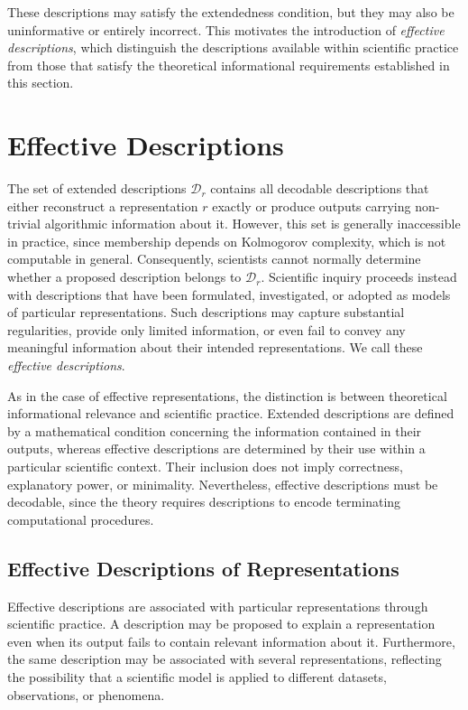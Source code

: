 These descriptions may satisfy the extendedness condition, but they may also be uninformative or entirely incorrect. This motivates the introduction of \emph{effective descriptions}, which distinguish the descriptions available within scientific practice from those that satisfy the theoretical informational requirements established in this section.

%
%

\section{Effective Descriptions}
\label{sec:effective_descriptions}

The set of extended descriptions $\mathcal{D}_r$ contains all decodable descriptions that either reconstruct a representation $r$ exactly or produce outputs carrying non-trivial algorithmic information about it. However, this set is generally inaccessible in practice, since membership depends on Kolmogorov complexity, which is not computable in general. Consequently, scientists cannot normally determine whether a proposed description belongs to $\mathcal{D}_r$. Scientific inquiry proceeds instead with descriptions that have been formulated, investigated, or adopted as models of particular representations. Such descriptions may capture substantial regularities, provide only limited information, or even fail to convey any meaningful information about their intended representations. We call these \emph{effective descriptions}.

As in the case of effective representations, the distinction is between theoretical informational relevance and scientific practice. Extended descriptions are defined by a mathematical condition concerning the information contained in their outputs, whereas effective descriptions are determined by their use within a particular scientific context. Their inclusion does not imply correctness, explanatory power, or minimality. Nevertheless, effective descriptions must be decodable, since the theory requires descriptions to encode terminating computational procedures.


\subsection*{Effective Descriptions of Representations}

Effective descriptions are associated with particular representations through scientific practice. A description may be proposed to explain a representation even when its output fails to contain relevant information about it. Furthermore, the same description may be associated with several representations, reflecting the possibility that a scientific model is applied to different datasets, observations, or phenomena.

